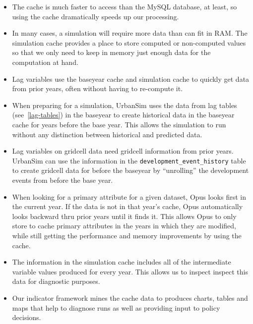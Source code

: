 \begin{itemize}
  \item The cache is much faster to access than the MySQL \mysqlindex database, at least,
  so using the cache dramatically speeds up our processing.
  \item In many cases, a simulation will require more data than can fit in RAM.
  The simulation cache \simulationcacheindex provides a place to store computed
  or non-computed values so that we only need to keep in memory just enough
  data for the computation at hand. 
  \item Lag variables use the baseyear cache \baseyearcacheindex and simulation
  cache \simulationcacheindex to quickly get data from prior years, often
  without having to re-compute it.
  \item When preparing for a simulation, UrbanSim uses the data from lag tables
  (see~\ref{lag-tables}) in the baseyear to create historical data in the
  baseyear cache \baseyearcacheindex for years before the base year.  This
  allows the simulation to run without any distinction between historical and
  predicted data.
  \item Lag variables on gridcell data need gridcell information from prior
  years.  UrbanSim can use the information in the
  \verb|development_event_history| table to create gridcell data for before the
  baseyear by ``unrolling'' the development events from before the base year.
  \item When looking for a primary attribute \primaryattributesindex for a given dataset, \datasetindex Opus
  looks first in the current year.  If the data is not in that year's cache,
  Opus automatically looks backward thru prior years until it finds it.  This
  allows Opus to only store to cache primary attributes \primaryattributesindex in the years in
  which they are modified, while still getting the performance and memory
  improvements by using the cache. 
  \item The information in the simulation cache \simulationcacheindex includes all
  of the intermediate variable values produced for every year.  This allows us
  to inspect inspect this data for diagnostic purposes.
  \item Our indicator framework mines the cache data to produces charts, tables
  and maps that help to diagnose runs as well as providing input to policy
  decisions.
\end{itemize}


